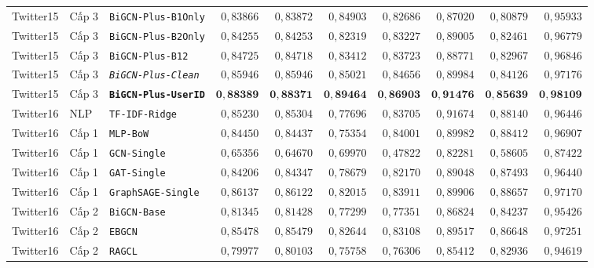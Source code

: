 \documentclass[11pt,a4paper]{extreport}
\begin{document}
\begin{table}[htbp]
\begin{tabular}{@{}lllrrrrrrr@{}}
        Twitter15 & Cấp 3 & \texttt{BiGCN-Plus-B1Only} & $0{,}83866$ & $0{,}83872$ & $0{,}84903$ & $0{,}82686$ & $0{,}87020$ & $0{,}80879$ & $0{,}95933$ \\
        Twitter15 & Cấp 3 & \texttt{BiGCN-Plus-B2Only} & $0{,}84255$ & $0{,}84253$ & $0{,}82319$ & $0{,}83227$ & $0{,}89005$ & $0{,}82461$ & $0{,}96779$ \\
        Twitter15 & Cấp 3 & \texttt{BiGCN-Plus-B12}    & $0{,}84725$ & $0{,}84718$ & $0{,}83412$ & $0{,}83723$ & $0{,}88771$ & $0{,}82967$ & $0{,}96846$ \\
        Twitter15 & Cấp 3 & \textit{\texttt{BiGCN-Plus-Clean}}  & $\mathit{0{,}85946}$ & $\mathit{0{,}85946}$ & $\mathit{0{,}85021}$ & $\mathit{0{,}84656}$ & $\mathit{0{,}89984}$ & $\mathit{0{,}84126}$ & $\mathit{0{,}97176}$ \\
        Twitter15 & Cấp 3 & \textbf{\texttt{BiGCN-Plus-UserID}} & $\mathbf{0{,}88389}$ & $\mathbf{0{,}88371}$ & $\mathbf{0{,}89464}$ & $\mathbf{0{,}86903}$ & $\mathbf{0{,}91476}$ & $\mathbf{0{,}85639}$ & $\mathbf{0{,}98109}$ \\
        \addlinespace[4pt]
        Twitter16 & NLP   & \texttt{TF-IDF-Ridge}      & $0{,}85230$ & $0{,}85304$ & $0{,}77696$ & $0{,}83705$ & $0{,}91674$ & $0{,}88140$ & $0{,}96446$ \\
        Twitter16 & Cấp 1 & \texttt{MLP-BoW}           & $0{,}84450$ & $0{,}84437$ & $0{,}75354$ & $0{,}84001$ & $0{,}89982$ & $0{,}88412$ & $0{,}96907$ \\
        Twitter16 & Cấp 1 & \texttt{GCN-Single}        & $0{,}65356$ & $0{,}64670$ & $0{,}69970$ & $0{,}47822$ & $0{,}82281$ & $0{,}58605$ & $0{,}87422$ \\
        Twitter16 & Cấp 1 & \texttt{GAT-Single}        & $0{,}84206$ & $0{,}84347$ & $0{,}78679$ & $0{,}82170$ & $0{,}89048$ & $0{,}87493$ & $0{,}96440$ \\
        Twitter16 & Cấp 1 & \texttt{GraphSAGE-Single}  & $0{,}86137$ & $0{,}86122$ & $0{,}82015$ & $0{,}83911$ & $0{,}89906$ & $0{,}88657$ & $0{,}97170$ \\
        Twitter16 & Cấp 2 & \texttt{BiGCN-Base}        & $0{,}81345$ & $0{,}81428$ & $0{,}77299$ & $0{,}77351$ & $0{,}86824$ & $0{,}84237$ & $0{,}95426$ \\
        Twitter16 & Cấp 2 & \texttt{EBGCN}             & $0{,}85478$ & $0{,}85479$ & $0{,}82644$ & $0{,}83108$ & $0{,}89517$ & $0{,}86648$ & $0{,}97251$ \\
        Twitter16 & Cấp 2 & \texttt{RAGCL}             & $0{,}79977$ & $0{,}80103$ & $0{,}75758$ & $0{,}76306$ & $0{,}85412$ & $0{,}82936$ & $0{,}94619$ \\

\end{tabular}
\end{table}
\end{document}
